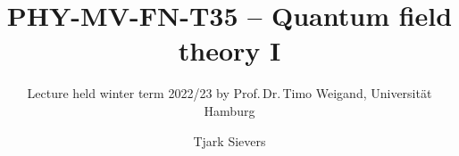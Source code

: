 \documentclass[a4paper, twoside]{scrbook}
\begin{document}
\title{PHY-MV-FN-T35 -- Quantum field theory I}
\author{Tjark Sievers}
\subtitle{Lecture held winter term 2022/23 by Prof.\,Dr.\,Timo Weigand, Universität Hamburg}
\date{}
\maketitle




\end{document}

